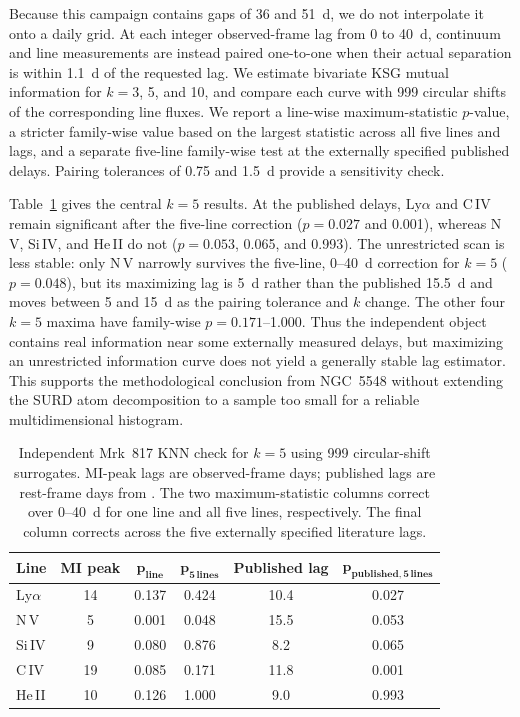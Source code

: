 \documentclass[fleqn,usenatbib]{mnras}
\begin{document}
Because this campaign contains gaps of 36 and 51~d, we do not interpolate it onto a daily grid. At each integer observed-frame lag from 0 to 40~d, continuum and line measurements are instead paired one-to-one when their actual separation is within 1.1~d of the requested lag. We estimate bivariate KSG mutual information for $k=3$, 5, and 10, and compare each curve with 999 circular shifts of the corresponding line fluxes. We report a line-wise maximum-statistic $p$-value, a stricter family-wise value based on the largest statistic across all five lines and lags, and a separate five-line family-wise test at the externally specified published delays. Pairing tolerances of 0.75 and 1.5~d provide a sensitivity check.

Table~\ref{tab:mrk817_replication} gives the central $k=5$ results. At the published delays, Ly$\alpha$ and C\,IV remain significant after the five-line correction ($p=0.027$ and 0.001), whereas N\,V, Si\,IV, and He\,II do not ($p=0.053$, 0.065, and 0.993). The unrestricted scan is less stable: only N\,V narrowly survives the five-line, 0--40~d correction for $k=5$ ($p=0.048$), but its maximizing lag is 5~d rather than the published 15.5~d and moves between 5 and 15~d as the pairing tolerance and $k$ change. The other four $k=5$ maxima have family-wise $p=0.171$--1.000. Thus the independent object contains real information near some externally measured delays, but maximizing an unrestricted information curve does not yield a generally stable lag estimator. This supports the methodological conclusion from NGC~5548 without extending the SURD atom decomposition to a sample too small for a reliable multidimensional histogram.

\begin{table}
\centering
\begin{tabular}{lccccc}
\hline
\textbf{Line} & \textbf{MI peak} & $\boldsymbol{p}_{\mathbf{line}}$ & $\boldsymbol{p}_{\mathbf{5\,lines}}$ & \textbf{Published lag} & $\boldsymbol{p}_{\mathbf{published,5\,lines}}$ \\
\hline
Ly$\alpha$ & 14 & 0.137 & 0.424 & 10.4 & 0.027 \\
N\,V       & 5  & 0.001 & 0.048 & 15.5 & 0.053 \\
Si\,IV     & 9  & 0.080 & 0.876 & 8.2  & 0.065 \\
C\,IV      & 19 & 0.085 & 0.171 & 11.8 & 0.001 \\
He\,II     & 10 & 0.126 & 1.000 & 9.0  & 0.993 \\
\hline
\end{tabular}
\caption{Independent Mrk~817 KNN check for $k=5$ using 999 circular-shift surrogates. MI-peak lags are observed-frame days; published lags are rest-frame days from \citet{Homayouni2023}. The two maximum-statistic columns correct over 0--40~d for one line and all five lines, respectively. The final column corrects across the five externally specified literature lags.}
\label{tab:mrk817_replication}
\end{table}
\end{document}

